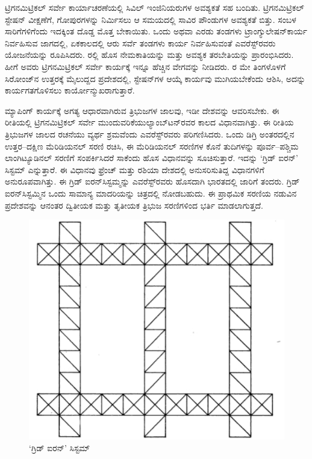 ಟ್ರಿಗನಮಿಟ್ರಿಕಲ್​ ಸರ್ವೇ ಕಾರ್ಯಾಚರಣೆಯಲ್ಲಿ ಸಿವಿಲ್​ ಇಂಜಿನಿಯರುಗಳ ಅವಶ್ಯಕತೆ ಸಹ ಬಂದಿತು. ಟ್ರಿಗನಮಿಟ್ರಿಕಲ್​ ಸ್ಟೇಷನ್​ ವೀಕ್ಷಣೆಗೆ, ಗೋಪುರಗಳನ್ನು ನಿರ್ಮಿಸಲು ಆ ಸಮಯದಲ್ಲಿ  ಸಾವಿರ ಪೌಂಡುಗಳ ಅವಶ್ಯಕತೆ ಬಿತ್ತು. ಸಂಬಳ ಸಾರಿಗೆಗಳಿಗೆಂದು ಇದಕ್ಕಿಂತ ದೊಡ್ಡ ಮೊತ್ತ ಬೇಕಾಯಿತು. ಒಂದು ಅಥವಾ ಎರಡು ತಂಡಗಳು ಟ್ರಾಂಗ್ಯುಲೇಷನ್​ ಕಾರ್ಯ ನಿರ್ವಹಿಸುವ ಜಾಗದಲ್ಲಿ, ಏಕಕಾಲದಲ್ಲಿ ಆರು ಸರ್ವೆ ತಂಡಗಳು ಕಾರ್ಯ ನಿರ್ವಹಿಸುವಂತೆ ಎವರೆಸ್ಟ್​ರವರು ಯೋಜನೆಯನ್ನು ರೂಪಿಸಿದರು. ರಲ್ಲಿ ಹೊಸ ನೇಮಕಾತಿಯನ್ನು ಮತ್ತು ಅವಶ್ಯಕ ತರಬೇತಿಯನ್ನು ಪ್ರಾರಂಭಿಸಿದರು. ಹೀಗೆ ಅವರು ಟ್ರಿಗನಮಿಟ್ರಿಕಲ್​ ಸರ್ವೇ ಕಾರ್ಯಕ್ಕೆ ಇನ್ನೂ ಹೆಚ್ಚಿನ ವೇಗವನ್ನು ನೀಡಿದರು. ರ ಮೇ ತಿಂಗಳೊಳಗೆ ಸಿರೋಂಜ್​ನ ಉತ್ತರಕ್ಕೆ  ಮೈಲುದ್ದದ ಪ್ರದೇಶದಲ್ಲಿ, ಸ್ಟೇಷನ್​ಗಳ ಆಯ್ಕೆ ಕಾರ್ಯವು ಮುಗಿಯಬೇಕೆಂದು ಆಶಿಸಿ, ಅದನ್ನು ಕಾರ್ಯಗತಗೊಳಿಸಲು ಕಾರ್ಯೋನ್ಮುಖರಾಗುತ್ತಾರೆ.

ಮ್ಯಾಪಿಂಗ್​ ಕಾರ್ಯಕ್ಕೆ ಅಗತ್ಯ ಆಧಾರವಾಗಿರುವ ತ್ರಿಭುಜಗಳ ಜಾಲವು, ಇಡೀ ದೇಶವನ್ನು ಆವರಿಸಬೇಕು. ಈ ರೀತಿಯಲ್ಲಿ ಟ್ರಿಗನಮಿಟ್ರಿಕಲ್​ ಸರ್ವೇ ಮುಂದುವರಿಕೆಯು\break ಲ್ಯಾಂಬ್​ಟನ್​ರವರ ಕಾಲದ ವಿಧಾನವಾಗಿತ್ತು. ಈ ರೀತಿಯ ತ್ರಿಭುಜಗಳ ಜಾಲದ ರಚನೆಯು ವ್ಯರ್ಥ ಶ್ರಮವೆಂದು ಎವರೆಸ್ಟ್​ರವರು ಪರಿಗಣಿಸಿದರು. ಒಂದು ಡಿಗ್ರಿ ಅಂತರದಲ್ಲಿನ ಉತ್ತರ–ದಕ್ಷಿಣ ಮೆರಿಡಿಯನಲ್​ ಸರಣಿ ರಚಿಸಿ, ಈ ಮೆರಿಡಿಯನಲ್​ ಸರಣಿಗಳ ಕೊನೆ ತುದಿಗಳನ್ನು ಪೂರ್ವ–ಪಶ್ಚಿಮ ಲಾಂಗಿಟ್ಯೂಡಿನಲ್​ ಸರಣಿಗೆ ಸಂಪರ್ಕಿಸಿದರೆ ಸಾಕೆಂದು ಹೊಸ ವಿಧಾನವನ್ನು ಸೂಚಿಸುತ್ತಾರೆ. ಇದನ್ನು ‘ಗ್ರಿಡ್​ ಐರನ್​’ ಸಿಸ್ಟಮ್ ಎನ್ನುತ್ತಾರೆ. ಈ ವಿಧಾನವು ಫ್ರೆಂಚ್​ ಮತ್ತು ರಶಿಯಾ ದೇಶದಲ್ಲಿ ಅನುಸರಿಸುತಿದ್ದ ವಿಧಾನಗಳಿಗೆ ಅನುರೂಪವಾಗಿತ್ತು. ಈ ಗ್ರಿಡ್​ ಐರನ್​\break ಸಿಸ್ಟಮ್ಮನ್ನು ಎವರೆಸ್ಟ್​ರವರು ಹೊಸದಾಗಿ ಭಾರತದಲ್ಲಿ ಜಾರಿಗೆ ತಂದರು. ಗ್ರಿಡ್​ ಐರನ್​\break ಸಿಸ್ಟಮ್ಮಿನ ಒಂದು ಸಾಮಾನ್ಯ ಮಾದರಿಯನ್ನು ಚಿತ್ರದಲ್ಲಿ ನೋಡಬಹುದು. ಈ ಪ್ರಾಥಮಿಕ ಸರಣಿಯ ನಡುವಿನ ಪ್ರದೇಶವನ್ನು ಆನಂತರ ದ್ವಿತೀಯಕ ಮತ್ತು ತೃತೀಯಕ ತ್ರಿಭುಜ ಸರಣಿಗಳಿಂದ ಭರ್ತಿ ಮಾಡಲಾಗುತ್ತದೆ.

\begin{figure}[!htbp]
\includegraphics[scale=0.8]{"images/image013.jpg"}
\caption{‘ಗ್ರಿಡ್​ ಐರನ್​’ ಸಿಸ್ಟಮ್}\label{art11-fig1}
\end{figure}

